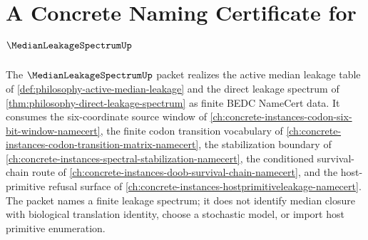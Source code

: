 \chapter{A Concrete Naming Certificate for $\MedianLeakageSpectrumUp$}
\label{ch:concrete-instances-median-leakage-spectrum-namecert}

The $\MedianLeakageSpectrumUp$ packet realizes the active median leakage table of \autoref{def:philosophy-active-median-leakage} and the direct leakage spectrum of \autoref{thm:philosophy-direct-leakage-spectrum} as finite BEDC NameCert data. It consumes the six-coordinate source window of \autoref{ch:concrete-instances-codon-six-bit-window-namecert}, the finite codon transition vocabulary of \autoref{ch:concrete-instances-codon-transition-matrix-namecert}, the stabilization boundary of \autoref{ch:concrete-instances-spectral-stabilization-namecert}, the conditioned survival-chain route of \autoref{ch:concrete-instances-doob-survival-chain-namecert}, and the host-primitive refusal surface of \autoref{ch:concrete-instances-hostprimitiveleakage-namecert}. The packet names a finite leakage spectrum; it does not identify median closure with biological translation identity, choose a stochastic model, or import host primitive enumeration.

